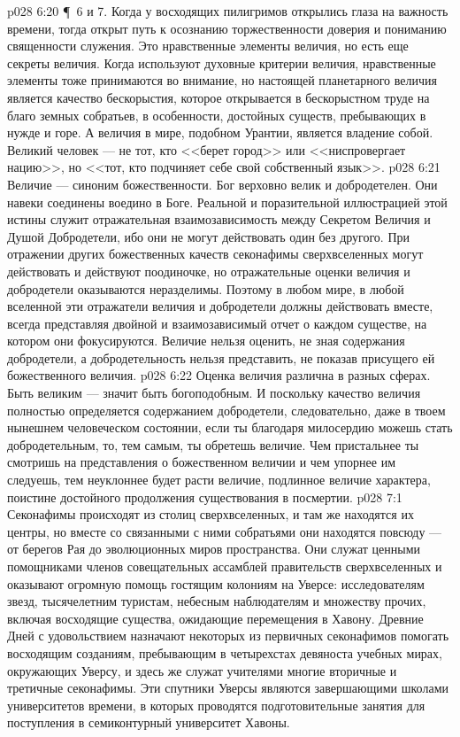\vs p028 6:20 \P\ 6 и 7.  Когда у восходящих пилигримов открылись глаза на важность времени, тогда открыт путь к осознанию торжественности доверия и пониманию священности служения. Это нравственные элементы величия, но есть еще секреты величия. Когда используют духовные критерии величия, нравственные элементы тоже принимаются во внимание, но настоящей  планетарного величия является качество бескорыстия, которое открывается в бескорыстном труде на благо земных собратьев, в особенности, достойных существ, пребывающих в нужде и горе. А  величия в мире, подобном Урантии, является владение собой. Великий человек --- не тот, кто <<берет город>> или <<ниспровергает нацию>>, но <<тот, кто подчиняет себе свой собственный язык>>.
\vs p028 6:21 Величие --- синоним божественности. Бог верховно велик и добродетелен.  Они навеки соединены воедино в Боге. Реальной и поразительной иллюстрацией этой истины служит отражательная взаимозависимость между Секретом Величия и Душой Добродетели, ибо они не могут действовать один без другого. При отражении других божественных качеств секонафимы сверхвселенных могут действовать и действуют поодиночке, но отражательные оценки величия и добродетели оказываются неразделимы. Поэтому в любом мире, в любой вселенной эти отражатели величия и добродетели должны действовать вместе, всегда представляя двойной и взаимозависимый отчет о каждом существе, на котором они фокусируются. Величие нельзя оценить, не зная содержания добродетели, а добродетельность нельзя представить, не показав присущего ей божественного величия.
\vs p028 6:22 Оценка величия различна в разных сферах. Быть великим --- значит быть богоподобным. И поскольку качество величия полностью определяется содержанием добродетели, следовательно, даже в твоем нынешнем человеческом состоянии, если ты благодаря милосердию можешь стать добродетельным, то, тем самым, ты обретешь величие. Чем пристальнее ты смотришь на представления о божественном величии и чем упорнее им следуешь, тем неуклоннее будет расти величие, подлинное величие характера, поистине достойного продолжения существования в посмертии.
\vs p028 7:1 Секонафимы происходят из столиц сверхвселенных, и там же находятся их центры, но вместе со связанными с ними собратьями они находятся повсюду --- от берегов Рая до эволюционных миров пространства. Они служат ценными помощниками членов совещательных ассамблей правительств сверхвселенных и оказывают огромную помощь гостящим колониям на Уверсе: исследователям звезд, тысячелетним туристам, небесным наблюдателям и множеству прочих, включая восходящие существа, ожидающие перемещения в Хавону. Древние Дней с удовольствием назначают некоторых из первичных секонафимов помогать восходящим созданиям, пребывающим в четырехстах девяноста учебных мирах, окружающих Уверсу, и здесь же служат учителями многие вторичные и третичные секонафимы. Эти спутники Уверсы являются завершающими школами университетов времени, в которых проводятся подготовительные занятия для поступления в семиконтурный университет Хавоны.
